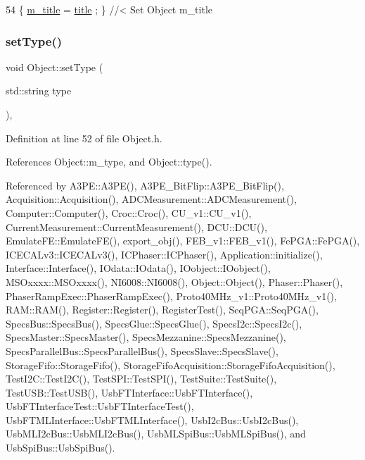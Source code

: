 \begin{DoxyCode}
54 \{ \hyperlink{classObject_affbeea1953eb5163573b92fad8f75727}{m\_title} = \hyperlink{classObject_a73a0f1a41828fdd8303dd662446fb6c3}{title} ; \} \textcolor{comment}{//< Set Object m\_title}
\end{DoxyCode}
\mbox{\label{classObject_aae534cc9d982bcb9b99fd505f2e103a5}} 
\subsubsection{\texorpdfstring{set\+Type()}{setType()}}
{\footnotesize\ttfamily void Object\+::set\+Type (\begin{DoxyParamCaption}\item[{std\+::string}]{type }\end{DoxyParamCaption})\hspace{0.3cm}{\ttfamily [inline]}, {\ttfamily [inherited]}}



Definition at line 52 of file Object.\+h.



References Object\+::m\+\_\+type, and Object\+::type().



Referenced by A3\+P\+E\+::\+A3\+P\+E(), A3\+P\+E\+\_\+\+Bit\+Flip\+::\+A3\+P\+E\+\_\+\+Bit\+Flip(), Acquisition\+::\+Acquisition(), A\+D\+C\+Measurement\+::\+A\+D\+C\+Measurement(), Computer\+::\+Computer(), Croc\+::\+Croc(), C\+U\+\_\+v1\+::\+C\+U\+\_\+v1(), Current\+Measurement\+::\+Current\+Measurement(), D\+C\+U\+::\+D\+C\+U(), Emulate\+F\+E\+::\+Emulate\+F\+E(), export\+\_\+obj(), F\+E\+B\+\_\+v1\+::\+F\+E\+B\+\_\+v1(), Fe\+P\+G\+A\+::\+Fe\+P\+G\+A(), I\+C\+E\+C\+A\+Lv3\+::\+I\+C\+E\+C\+A\+Lv3(), I\+C\+Phaser\+::\+I\+C\+Phaser(), Application\+::initialize(), Interface\+::\+Interface(), I\+Odata\+::\+I\+Odata(), I\+Oobject\+::\+I\+Oobject(), M\+S\+Oxxxx\+::\+M\+S\+Oxxxx(), N\+I6008\+::\+N\+I6008(), Object\+::\+Object(), Phaser\+::\+Phaser(), Phaser\+Ramp\+Exec\+::\+Phaser\+Ramp\+Exec(), Proto40\+M\+Hz\+\_\+v1\+::\+Proto40\+M\+Hz\+\_\+v1(), R\+A\+M\+::\+R\+A\+M(), Register\+::\+Register(), Register\+Test(), Seq\+P\+G\+A\+::\+Seq\+P\+G\+A(), Specs\+Bus\+::\+Specs\+Bus(), Specs\+Glue\+::\+Specs\+Glue(), Specs\+I2c\+::\+Specs\+I2c(), Specs\+Master\+::\+Specs\+Master(), Specs\+Mezzanine\+::\+Specs\+Mezzanine(), Specs\+Parallel\+Bus\+::\+Specs\+Parallel\+Bus(), Specs\+Slave\+::\+Specs\+Slave(), Storage\+Fifo\+::\+Storage\+Fifo(), Storage\+Fifo\+Acquisition\+::\+Storage\+Fifo\+Acquisition(), Test\+I2\+C\+::\+Test\+I2\+C(), Test\+S\+P\+I\+::\+Test\+S\+P\+I(), Test\+Suite\+::\+Test\+Suite(), Test\+U\+S\+B\+::\+Test\+U\+S\+B(), Usb\+F\+T\+Interface\+::\+Usb\+F\+T\+Interface(), Usb\+F\+T\+Interface\+Test\+::\+Usb\+F\+T\+Interface\+Test(), Usb\+F\+T\+M\+L\+Interface\+::\+Usb\+F\+T\+M\+L\+Interface(), Usb\+I2c\+Bus\+::\+Usb\+I2c\+Bus(), Usb\+M\+L\+I2c\+Bus\+::\+Usb\+M\+L\+I2c\+Bus(), Usb\+M\+L\+Spi\+Bus\+::\+Usb\+M\+L\+Spi\+Bus(), and Usb\+Spi\+Bus\+::\+Usb\+Spi\+Bus().


